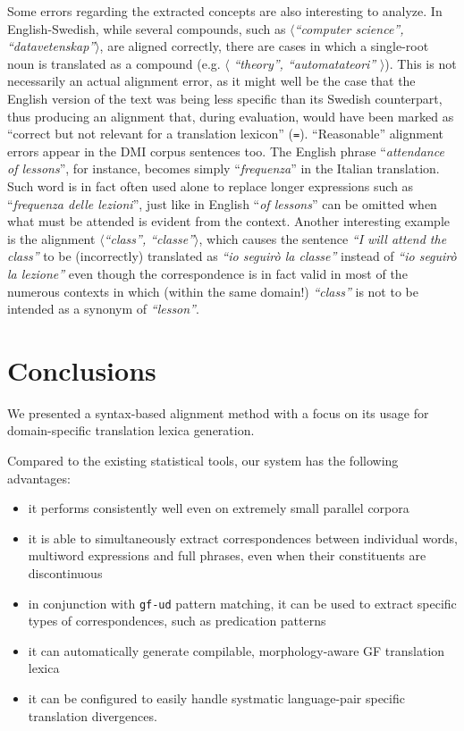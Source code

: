 \documentclass[11pt]{article}
\begin{document}
Some errors regarding the extracted concepts are also interesting to analyze.
In English-Swedish, while several compounds, such as $\langle$\textit{``computer science'', ``datavetenskap''}$\rangle$, are aligned correctly, there are cases in which a single-root noun is translated as a compound (e.g. $\langle$ \textit{``theory'', ``automatateori''} $\rangle$). 
This is not necessarily an actual alignment error, as it might well be the case that the English version of the text was being less specific than its Swedish counterpart, thus producing an alignment that, during evaluation, would have been marked as ``correct but not relevant for a translation lexicon'' (\texttt{=}). 
``Reasonable'' alignment errors appear in the DMI corpus sentences too. 
The English phrase ``\textit{attendance of lessons}'', for instance, becomes simply ``\textit{frequenza}'' in the Italian translation. 
Such word is in fact often used alone to replace longer expressions such as ``\textit{frequenza delle lezioni}'', just like in English ``\textit{of lessons}'' can be omitted when what must be attended is evident from the context.
Another interesting example is the alignment $\langle$\textit{``class'', ``classe''}$\rangle$, which causes the sentence \textit{``I will attend the class''} to be (incorrectly) translated as \textit{``io seguirò la classe''} instead of \textit{``io seguirò la lezione''} even though the correspondence is in fact valid in most of the numerous contexts in which (within the same domain!) \textit{``class''} is not to be intended as a synonym of \textit{``lesson''}.

\section{Conclusions} \label{conclusions}
We presented a syntax-based alignment method with a focus on its usage for domain-specific translation lexica generation.

Compared to the existing statistical tools, our system has the following advantages:
\begin{itemize}
  \item it performs consistently well even on extremely small parallel corpora
  \item it is able to simultaneously extract correspondences between individual words, multiword expressions and full phrases, even when their constituents are discontinuous
  \item in conjunction with \texttt{gf-ud} pattern matching, it can be used to extract specific types of correspondences, such as predication patterns  
  \item it can automatically generate compilable, morphology-aware GF translation lexica
  \item it can be configured to easily handle systmatic language-pair specific translation divergences.
\end{itemize}
\end{document}
